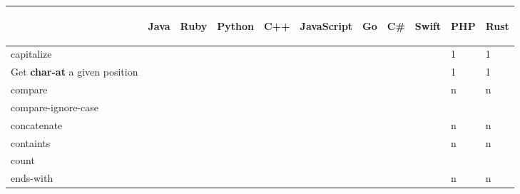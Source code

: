 \documentclass[anonymous,sigplan,review,11pt,nonacm,natbib=false]{acmart}
\begin{document}
    \begin{table*}
        \begin{tabular}{lllllllllll}
            \hline
            & \begin{sideways}Java\end{sideways}
            & \begin{sideways}Ruby\end{sideways}
            & \begin{sideways}Python\end{sideways}
            & \begin{sideways}C++\end{sideways}
            & \begin{sideways}JavaScript\end{sideways}
            & \begin{sideways}Go\end{sideways}
            & \begin{sideways}C\#\end{sideways}
            & \begin{sideways}Swift\end{sideways}
            & \begin{sideways}PHP\end{sideways}
            & \begin{sideways}Rust\end{sideways}
            \\ \hline

            capitalize &  &  &  &  &  & &  &  & 1 & 1 \\

            Get \textbf{char-at} a given position &  &  &  &  &  & &  &  & 1 & 1 \\

            compare &  &  &  &  &  & &  &  & n & n \\

            compare-ignore-case &  &  &  &  &  & &  &  &  & \\

            concatenate &  &  &  &  &  & &  &  & n & n \\

            containts &  &  &  &  &  & &  &  & n & n \\

            count &  &  &  &  &  & &  &  &  & \\

            ends-with &  &  &  &  &  & &  &  & n & n \\


\end{tabular}
\end{table*}
\end{document}
